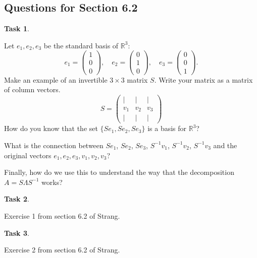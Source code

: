 \documentclass[10pt,]{book}
\theoremstyle{plain}
\theoremstyle{definition}
\numberwithin{equation}{section}
\newtheorem{task}{Task}[chapter]
\begin{document}
\subsection[Questions for Section 6.2]{Questions for Section 6.2}\label{subsection-133}
\begin{task}
\label{task-164}

          Let \(e_1, e_2, e_3\) be the standard basis of \(\mathbb{R}^3\):
          \[
            e_1 = \begin{pmatrix} 1 \\ 0 \\ 0 \end{pmatrix}, \quad
            e_2 = \begin{pmatrix} 0 \\ 1 \\ 0 \end{pmatrix}, \quad
            e_3 = \begin{pmatrix} 0 \\ 0 \\ 1 \end{pmatrix}.
          \]
          Make an example of an invertible \(3 \times 3\) matrix \(S\).
          Write your matrix as a matrix of column vectors.
          \[
            S = \begin{pmatrix} | & | & | \\ v_1 & v_2 & v_3 \\
             | & | & | \end{pmatrix}
          \]
          How do you know that the set \(\{ Se_1, Se_2, Se_3 \}\) is a basis
          for \(\mathbb{R}^3\)?
\par

          What is the connection between \(Se_1\), \(Se_2\), \(Se_3\),
          \(S^{-1}v_1\), \(S^{-1}v_2\), \(S^{-1}v_3\) and the original
          vectors \(e_1, e_2, e_3, v_1, v_2, v_3\)?
\par

          Finally, how do we use this to understand the way that the decomposition
          \(A = S\Lambda S^{-1}\) works?
\end{task}
\begin{task}
\label{task-165}

        Exercise 1 from section 6.2 of Strang.
      \end{task}
\begin{task}
\label{task-166}

        Exercise 2 from section 6.2 of Strang.
      \end{task}
\end{document}
